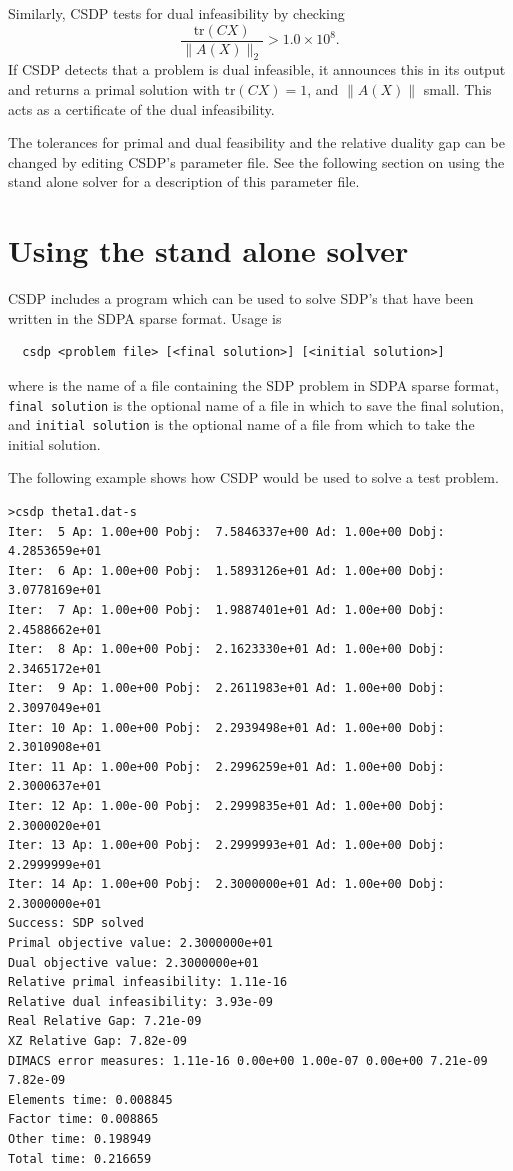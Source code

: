\documentclass{article}
\begin{document}
Similarly, CSDP tests for dual infeasibility by checking
\begin{equation}
  \frac{\mbox{tr}(CX)}{\| A(X) \|_{2}} > 1.0 \times 10^8.
\end{equation}
If CSDP detects that a problem is dual 
infeasible, it announces this in its output and returns a primal 
solution with $\mbox{tr}(CX)=1$, and $\| A(X)\|$ small.  This acts
as a certificate of the dual infeasibility.  

The tolerances for primal and dual feasibility and the relative duality
gap can be changed by editing CSDP's parameter file.  See the 
following section on using the stand alone solver for a description of
this parameter file.

\section*{Using the stand alone solver}
CSDP includes a program which can be used to solve SDP's that have
been written in the SDPA sparse format.   Usage is  
\begin{verbatim}
  csdp <problem file> [<final solution>] [<initial solution>]
\end{verbatim}
where {\tt <problem file>} is the name of a file containing the SDP
problem in SDPA sparse format, {\tt final solution} is the optional
name of a file in which to save the final solution, and {\tt initial
solution} is the optional name of a file from which to take the
initial solution.

The following example shows how CSDP would be used to solve a test problem.
\begin{verbatim}
>csdp theta1.dat-s
Iter:  5 Ap: 1.00e+00 Pobj:  7.5846337e+00 Ad: 1.00e+00 Dobj:  4.2853659e+01 
Iter:  6 Ap: 1.00e+00 Pobj:  1.5893126e+01 Ad: 1.00e+00 Dobj:  3.0778169e+01 
Iter:  7 Ap: 1.00e+00 Pobj:  1.9887401e+01 Ad: 1.00e+00 Dobj:  2.4588662e+01 
Iter:  8 Ap: 1.00e+00 Pobj:  2.1623330e+01 Ad: 1.00e+00 Dobj:  2.3465172e+01 
Iter:  9 Ap: 1.00e+00 Pobj:  2.2611983e+01 Ad: 1.00e+00 Dobj:  2.3097049e+01 
Iter: 10 Ap: 1.00e+00 Pobj:  2.2939498e+01 Ad: 1.00e+00 Dobj:  2.3010908e+01 
Iter: 11 Ap: 1.00e+00 Pobj:  2.2996259e+01 Ad: 1.00e+00 Dobj:  2.3000637e+01 
Iter: 12 Ap: 1.00e-00 Pobj:  2.2999835e+01 Ad: 1.00e+00 Dobj:  2.3000020e+01 
Iter: 13 Ap: 1.00e+00 Pobj:  2.2999993e+01 Ad: 1.00e+00 Dobj:  2.2999999e+01 
Iter: 14 Ap: 1.00e+00 Pobj:  2.3000000e+01 Ad: 1.00e+00 Dobj:  2.3000000e+01 
Success: SDP solved
Primal objective value: 2.3000000e+01 
Dual objective value: 2.3000000e+01 
Relative primal infeasibility: 1.11e-16 
Relative dual infeasibility: 3.93e-09 
Real Relative Gap: 7.21e-09 
XZ Relative Gap: 7.82e-09 
DIMACS error measures: 1.11e-16 0.00e+00 1.00e-07 0.00e+00 7.21e-09 7.82e-09
Elements time: 0.008845 
Factor time: 0.008865 
Other time: 0.198949 
Total time: 0.216659 
\end{verbatim} 
\end{document}
